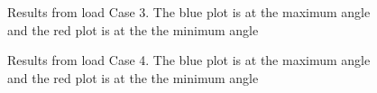 \begin{figure}[H]
\hfill
{}\hfill
\caption[$\; \:$Results from load Case 3]{Results from load Case 3. The blue plot is at the maximum angle and the red plot is at the the minimum angle}
\label{fig:r3}
\end{figure}

\begin{figure}[H]
\hfill
{}\hfill
\caption[$\; \:$Results from load Case 4]{Results from load Case 4. The blue plot is at the maximum angle and the red plot is at the the minimum angle}
\label{fig:r4}
\end{figure}

